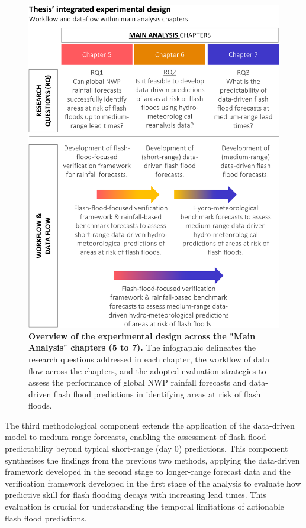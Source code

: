 \begin{figure}[htbp]
\centering
\includegraphics[width=\textwidth]{workflow_dataflow.png}
\caption{\textbf{Overview of the experimental design across the "Main Analysis" chapters (5 to 7).} The infographic delineates the research questions addressed in each chapter, the workflow of data flow across the chapters, and the adopted evaluation strategies to assess the performance of global NWP rainfall forecasts and data-driven flash flood predictions in identifying areas at risk of flash floods.}
\label{fig:workflow_dataflow}
\end{figure}

The  third methodological component extends the application of the data-driven model to medium-range forecasts, enabling the assessment of flash flood predictability beyond typical short-range (day 0) predictions. This component synthesises the findings from the previous two methods, applying the data-driven framework developed in the second stage to longer-range forecast data and the verification framework developed in the first stage of the analysis to evaluate how predictive skill for flash flooding decays with increasing lead times. This evaluation is crucial for understanding the temporal limitations of actionable flash flood predictions.




